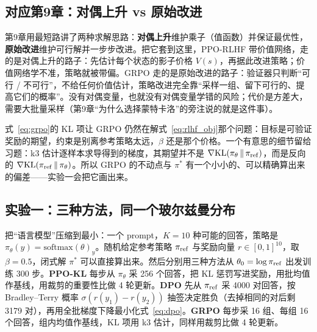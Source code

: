 \subsection{对应第9章：对偶上升 vs 原始改进}

第9章用最短路讲了两种求解思路：\textbf{对偶上升}维护乘子（值函数）并保证最优性，\textbf{原始改进}维护可行解并一步步改进。把它套到这里，PPO-RLHF 带价值网络，走的是对偶上升的路子：先估计每个状态的影子价格 $V(s)$，再据此改进策略；价值网络学不准，策略就被带偏。GRPO 走的是原始改进的路子：验证器只判断“可行 / 不可行”，不给任何价值估计，策略改进完全靠“采样一组、留下可行的、提高它们的概率”。没有对偶变量，也就没有对偶变量学错的风险；代价是方差大，需要大批量采样（第9章“为什么选择蒙特卡洛”的旁注说的就是这件事）。

式~\eqref{eq:grpo}的 KL 项让 GRPO 仍然在解式~\eqref{eq:rlhf_obj}那个问题：目标是可验证奖励的期望，约束是别离参考策略太远，$\beta$ 还是那个价格。一个有意思的细节留给习题：k3 估计逐样本求导得到的梯度，其期望并不是 $\nabla\mathrm{KL}(\pi_\theta\,\|\,\pi_{\rm ref})$，而是反向的 $\nabla\mathrm{KL}(\pi_{\rm ref}\,\|\,\pi_\theta)$。所以 GRPO 的不动点与 $\pi^*$ 有一个小小的、可以精确算出来的偏差——实验一会把它画出来。

\subsection{实验一：三种方法，同一个玻尔兹曼分布}

把“语言模型”压缩到最小：一个 prompt，$K = 10$ 种可能的回答，策略是 $\pi_\theta(y) = \mathrm{softmax}(\theta)_y$。随机给定参考策略 $\pi_{\rm ref}$ 与奖励向量 $r \in [0,1]^{10}$，取 $\beta = 0.5$，闭式解 $\pi^*$ 可以直接算出来。然后分别用三种方法从 $\theta_0 = \log\pi_{\rm ref}$ 出发训练 300 步。\textbf{PPO-KL} 每步从 $\pi_\theta$ 采 256 个回答，把 KL 惩罚写进奖励，用批均值作基线，用裁剪的重要性比做 4 轮更新。\textbf{DPO} 先从 $\pi_{\rm ref}$ 采 4000 对回答，按 Bradley--Terry 概率 $\sigma(r(y_1) - r(y_2))$ 抽签决定胜负（去掉相同的对后剩 3179 对），再用全批梯度下降最小化式~\eqref{eq:dpo}。\textbf{GRPO} 每步采 16 组、每组 16 个回答，组内均值作基线，KL 项用 k3 估计，同样用裁剪比做 4 轮更新。

